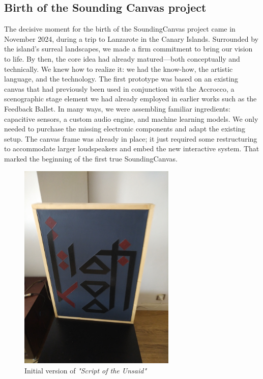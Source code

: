 \documentclass{article}
\begin{document}
\subsection{Birth of the Sounding Canvas project}
The decisive moment for the birth of the SoundingCanvas project came in November 2024, during a trip to Lanzarote in the Canary Islands. Surrounded by the island’s surreal landscapes, we made a firm commitment to bring our vision to life. By then, the core idea had already matured—both conceptually and technically. We knew how to realize it: we had the know-how, the artistic language, and the technology. The first prototype was based on an existing canvas that had previously been used in conjunction with the Accrocco, a scenographic stage element we had already employed in earlier works such as the Feedback Ballet. In many ways, we were assembling familiar ingredients: capacitive sensors, a custom audio engine, and machine learning models. We only needed to purchase the missing electronic components and adapt the existing setup. The canvas frame was already in place; it just required some restructuring to accommodate larger loudspeakers and embed the new interactive system. That marked the beginning of the first true SoundingCanvas.
\begin{figure}[h]
	\centering
	\includegraphics[height=10cm]{./images/script}
	\caption{Initial version of \emph{"Script of the Unsaid"}}
	\label{fig:script_of_the_unsaid}
\end{figure}
\end{document}
